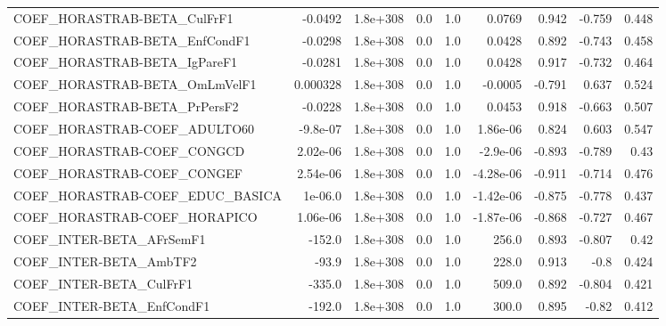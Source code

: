 \begin{tabular}{lrrrrrrrr}
COEF\_HORASTRAB-BETA\_CulFrF1           &     -0.0492 &     1.8e+308 &     0.0 &      1.0 &     0.0769 &       0.942 &       -0.759 &         0.448 \\
COEF\_HORASTRAB-BETA\_EnfCondF1         &     -0.0298 &     1.8e+308 &     0.0 &      1.0 &     0.0428 &       0.892 &       -0.743 &         0.458 \\
COEF\_HORASTRAB-BETA\_IgPareF1          &     -0.0281 &     1.8e+308 &     0.0 &      1.0 &     0.0428 &       0.917 &       -0.732 &         0.464 \\
COEF\_HORASTRAB-BETA\_OmLmVelF1         &    0.000328 &     1.8e+308 &     0.0 &      1.0 &    -0.0005 &      -0.791 &        0.637 &         0.524 \\
COEF\_HORASTRAB-BETA\_PrPersF2          &     -0.0228 &     1.8e+308 &     0.0 &      1.0 &     0.0453 &       0.918 &       -0.663 &         0.507 \\
COEF\_HORASTRAB-COEF\_ADULTO60          &    -9.8e-07 &     1.8e+308 &     0.0 &      1.0 &   1.86e-06 &       0.824 &        0.603 &         0.547 \\
COEF\_HORASTRAB-COEF\_CONGCD            &    2.02e-06 &     1.8e+308 &     0.0 &      1.0 &   -2.9e-06 &      -0.893 &       -0.789 &          0.43 \\
COEF\_HORASTRAB-COEF\_CONGEF            &    2.54e-06 &     1.8e+308 &     0.0 &      1.0 &  -4.28e-06 &      -0.911 &       -0.714 &         0.476 \\
COEF\_HORASTRAB-COEF\_EDUC\_BASICA       &     1e-06.0 &     1.8e+308 &     0.0 &      1.0 &  -1.42e-06 &      -0.875 &       -0.778 &         0.437 \\
COEF\_HORASTRAB-COEF\_HORAPICO          &    1.06e-06 &     1.8e+308 &     0.0 &      1.0 &  -1.87e-06 &      -0.868 &       -0.727 &         0.467 \\
COEF\_INTER-BETA\_AFrSemF1              &      -152.0 &     1.8e+308 &     0.0 &      1.0 &      256.0 &       0.893 &       -0.807 &          0.42 \\
COEF\_INTER-BETA\_AmbTF2                &       -93.9 &     1.8e+308 &     0.0 &      1.0 &      228.0 &       0.913 &         -0.8 &         0.424 \\
COEF\_INTER-BETA\_CulFrF1               &      -335.0 &     1.8e+308 &     0.0 &      1.0 &      509.0 &       0.892 &       -0.804 &         0.421 \\
COEF\_INTER-BETA\_EnfCondF1             &      -192.0 &     1.8e+308 &     0.0 &      1.0 &      300.0 &       0.895 &        -0.82 &         0.412 \\

\end{tabular}
